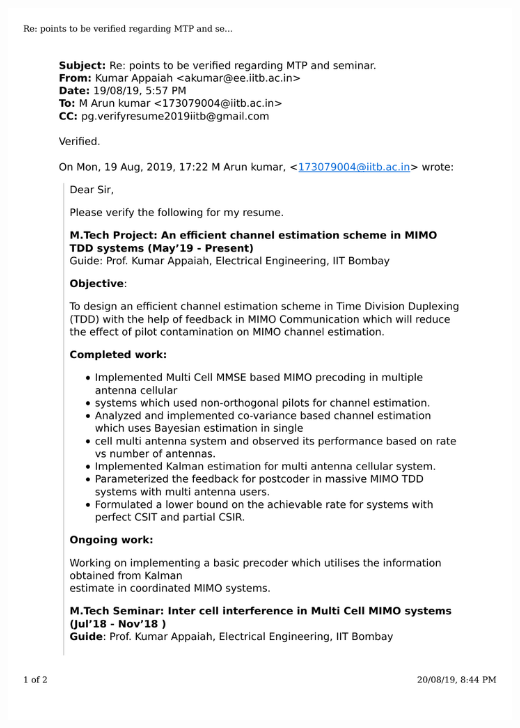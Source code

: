 \documentclass{article}
\begin{document}
	\includegraphics[page=2, scale=0.5]{proofs/mtp.pdf}
\end{document}

